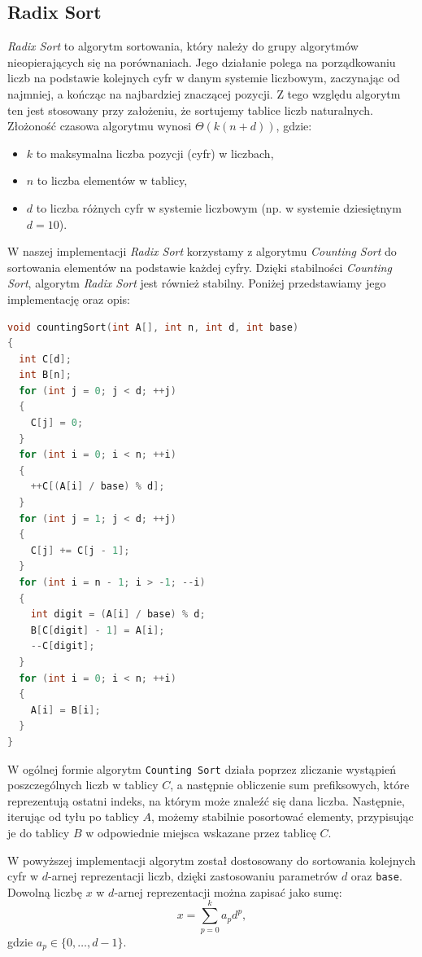 \documentclass{article}
\begin{document}
\subsection{Radix Sort}
\textit{Radix Sort} to algorytm sortowania, który należy do grupy algorytmów nieopierających się na porównaniach. Jego działanie polega na porządkowaniu liczb na podstawie kolejnych cyfr w danym systemie liczbowym, zaczynając od najmniej, a kończąc na najbardziej znaczącej pozycji. Z tego względu algorytm ten jest stosowany przy założeniu, że sortujemy tablice liczb naturalnych. Złożoność czasowa algorytmu wynosi $\Theta(k(n + d))$, gdzie:
\begin{itemize}
    \item $k$ to maksymalna liczba pozycji (cyfr) w liczbach,
    \item $n$ to liczba elementów w tablicy,
    \item $d$ to liczba różnych cyfr w systemie liczbowym (np. w systemie dziesiętnym $d = 10$).
\end{itemize}
W naszej implementacji \textit{Radix Sort} korzystamy z algorytmu \textit{Counting Sort} do sortowania elementów na podstawie każdej cyfry. Dzięki stabilności \textit{Counting Sort}, algorytm \textit{Radix Sort} jest również stabilny. Poniżej przedstawiamy jego implementację oraz opis:
\begin{lstlisting}[style=mystyle, language=C++, caption={Implementacja \texttt{Counting Sort}}, label={lst:countingsort}]
void countingSort(int A[], int n, int d, int base)
{
  int C[d];
  int B[n];
  for (int j = 0; j < d; ++j)
  {
    C[j] = 0;
  }
  for (int i = 0; i < n; ++i)
  {
    ++C[(A[i] / base) % d];
  }
  for (int j = 1; j < d; ++j)
  {
    C[j] += C[j - 1];
  }
  for (int i = n - 1; i > -1; --i)
  {
    int digit = (A[i] / base) % d;
    B[C[digit] - 1] = A[i];
    --C[digit];
  }
  for (int i = 0; i < n; ++i)
  {
    A[i] = B[i];
  }
}
\end{lstlisting}
W ogólnej formie algorytm \texttt{Counting Sort} działa poprzez zliczanie wystąpień poszczególnych liczb w tablicy $C$, a następnie obliczenie sum prefiksowych, które reprezentują ostatni indeks, na którym może znaleźć się dana liczba. Następnie, iterując od tyłu po tablicy $A$, możemy stabilnie posortować elementy, przypisując je do tablicy $B$ w odpowiednie miejsca wskazane przez tablicę $C$. 

W powyższej implementacji algorytm został dostosowany do sortowania kolejnych cyfr w $d$-arnej reprezentacji liczb, dzięki zastosowaniu parametrów $d$ oraz \texttt{base}. Dowolną liczbę $x$ w $d$-arnej reprezentacji można zapisać jako sumę:
\[
    x = \sum_{p=0}^{k} a_p d^p,
\]
gdzie $a_p \in \{0, \ldots, d-1\}$. 
\end{document}
